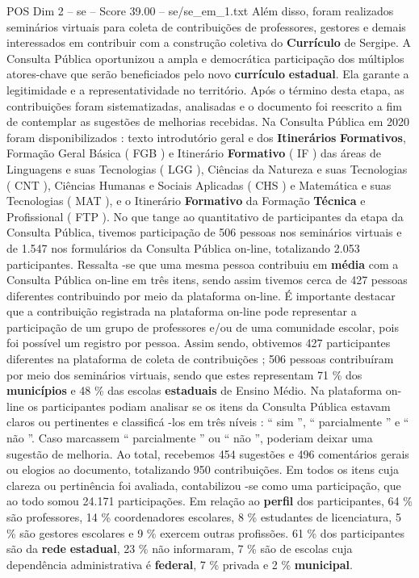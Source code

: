 \begin{textsample}{POS Dim 2 – se – Score 39.00 – se/se\_em\_1.txt}
Além disso, foram realizados seminários virtuais para coleta de contribuições de professores, gestores e demais interessados em contribuir com a construção coletiva do \textbf{Currículo} de Sergipe.
A Consulta Pública oportunizou a ampla e democrática participação dos múltiplos atores-chave que serão beneficiados pelo novo \textbf{currículo} \textbf{estadual}.
Ela garante a legitimidade e a representatividade no território.
Após o término desta etapa, as contribuições foram sistematizadas, analisadas e o documento foi reescrito a fim de contemplar as sugestões de melhorias recebidas.
Na Consulta Pública em 2020 foram disponibilizados : texto introdutório geral e dos \textbf{Itinerários} \textbf{Formativos}, Formação Geral Básica ( FGB ) e Itinerário \textbf{Formativo} ( IF ) das áreas de Linguagens e suas Tecnologias ( LGG ), Ciências da Natureza e suas Tecnologias ( CNT ), Ciências Humanas e Sociais Aplicadas ( CHS ) e Matemática e suas Tecnologias ( MAT ), e o Itinerário \textbf{Formativo} da Formação \textbf{Técnica} e Profissional ( FTP ).
No que tange ao quantitativo de participantes da etapa da Consulta Pública, tivemos participação de 506 pessoas nos seminários virtuais e de 1.547 nos formulários da Consulta Pública on-line, totalizando 2.053 participantes.
Ressalta -se que uma mesma pessoa contribuiu em \textbf{média} com a Consulta Pública on-line em três itens, sendo assim tivemos cerca de 427 pessoas diferentes contribuindo por meio da plataforma on-line.
É importante destacar que a contribuição registrada na plataforma on-line pode representar a participação de um grupo de professores e/ou de uma comunidade escolar, pois foi possível um registro por pessoa.
Assim sendo, obtivemos 427 participantes diferentes na plataforma de coleta de contribuições ; 506 pessoas contribuíram por meio dos seminários virtuais, sendo que estes representam 71 \% dos \textbf{municípios} e 48 \% das escolas \textbf{estaduais} de Ensino Médio.
Na plataforma on-line os participantes podiam analisar se os itens da Consulta Pública estavam claros ou pertinentes e classificá -los em três níveis : “ sim ”, “ parcialmente ” e “ não ”.
Caso marcassem “ parcialmente ” ou “ não ”, poderiam deixar uma sugestão de melhoria.
Ao total, recebemos 454 sugestões e 496 comentários gerais ou elogios ao documento, totalizando 950 contribuições.
Em todos os itens cuja clareza ou pertinência foi avaliada, contabilizou -se como uma participação, que ao todo somou 24.171 participações.
Em relação ao \textbf{perfil} dos participantes, 64 \% são professores, 14 \% coordenadores escolares, 8 \% estudantes de licenciatura, 5 \% são gestores escolares e 9 \% exercem outras profissões. 61 \% dos participantes são da \textbf{rede} \textbf{estadual}, 23 \% não informaram, 7 \% são de escolas cuja dependência administrativa é \textbf{federal}, 7 \% privada e 2 \% \textbf{municipal}.

\end{textsample}
